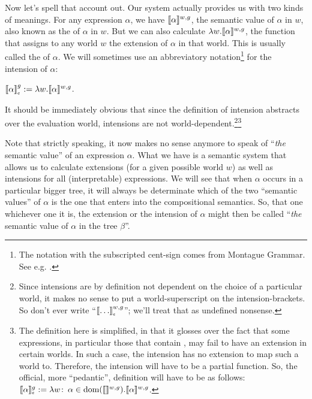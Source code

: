 Now %
%
let's spell that account out. Our system actually provides us with two kinds of
meanings. For any expression $\alpha$, we have $\llbracket \alpha \rrbracket^{w,g}$, the semantic
value of $\alpha$ in $w$, also known as the  of $\alpha$ in $w$.
But we can also calculate $\lambda w. \llbracket \alpha \rrbracket^{w,g}$, the function that
assigns to any world $w$ the extension of $\alpha$ in that world. This is
usually called the  of $\alpha$. We will sometimes use an
abbreviatory notation\footnote{The notation with the subscripted cent-sign comes
  from Montague Grammar. See e.g. \citet[147]{dowty-wall-peters:1981:intro}.}
for the intension of $\alpha$:

\ex $\svcent{\alpha}^g := \lambda w. \sv{\alpha}^{w,g}$. \xe

It should be immediately obvious that since the definition of intension
abstracts over the evaluation world, intensions are not
world-dependent.\footnote{Since intensions are by definition not dependent on
  the choice of a particular world, it makes no sense to put a world-superscript
  on the intension-brackets. So don't ever write ``$\svcent{\dots}^{w,g}$'';
  we'll treat that as undefined nonsense.}\footnote{The definition here is
  simplified, in that it glosses over the fact that some expressions, in
  particular those that contain , may fail to have
  an extension in certain worlds. In such a case, the intension has no extension
  to map such a world to. Therefore, the intension will have to be a partial
  function. So, the official, more ``pedantic'', definition will have to be as
  follows: $\sv{\alpha}_{\mbox{\tiny\textcent}}^g := \lambda w\co \alpha \in
  \mbox{dom}(\sv{\null}^{w,g}). \sv{\alpha}^{w,g}$.}

Note that strictly speaking, it now makes no sense anymore to speak of
``\emph{the} semantic value'' of an expression $\alpha$. What we have is a
semantic system that allows us to calculate extensions (for a given possible
world $w$) as well as intensions for all (interpretable) expressions. We will
see that when $\alpha$ occurs in a particular bigger tree, it will always be
determinate which of the two ``semantic values'' of $\alpha$ is the one that
enters into the compositional semantics. So, that one \dash whichever one it is,
the extension or the intension of $\alpha$ \dash might then be called
``\emph{the} semantic value of $\alpha$ in the tree $\beta$''.

